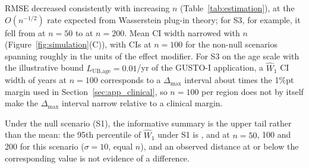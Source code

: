 \documentclass[AMA,Times1COL]{WileyNJDv5}
\begin{document}
RMSE decreased consistently with increasing $n$ (Table~\ref{tab:estimation}), at the $O(n^{-1/2})$ rate expected from Wasserstein plug-in theory; for S3, for example, it fell from  at $n=50$ to  at $n=200$. Mean CI width narrowed with $n$ (Figure~\ref{fig:simulation}(C)), with CIs at $n = 100$ for the non-null scenarios spanning roughly  in the units of the effect modifier. For S3 on the age scale with the illustrative bound $L_{\text{UB,age}} = 0.01$/yr of the GUSTO-I application, a $\widehat{W}_1$ CI width of  years at $n = 100$ corresponds to a $\Delta_{\max}$ interval about  times the 1\%pt margin used in Section~\ref{sec:app_clinical}, so $n = 100$ per region does not by itself make the $\Delta_{\max}$ interval narrow relative to a clinical margin.

Under the null scenario (S1), the informative summary is the upper tail rather than the mean: the 95th percentile of $\widehat{W}_1$ under S1 is ,  and  at $n = 50$, 100 and 200 for this scenario ($\sigma = 10$, equal $n$), and an observed distance at or below the corresponding value is not evidence of a difference.
\end{document}
